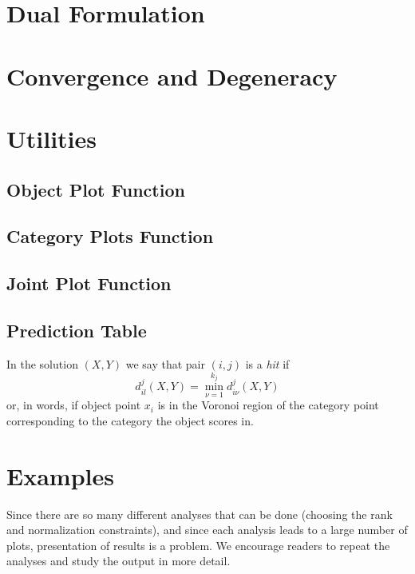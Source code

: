 \documentclass[
  12pt,
  letterpaper,
  DIV=11,
  numbers=noendperiod]{scrartcl}
\begin{document}
\section{Dual Formulation}\label{dual-formulation-1}

\section{Convergence and Degeneracy}\label{convergence-and-degeneracy}

\section{Utilities}\label{utilities}

\subsection{Object Plot Function}\label{object-plot-function}

\subsection{Category Plots Function}\label{category-plots-function}

\subsection{Joint Plot Function}\label{joint-plot-function}

\subsection{Prediction Table}\label{prediction-table}

In the solution \((X,Y)\) we say that pair \((i,j)\) is a \emph{hit} if
\[
d_{il}^j(X,Y)=\min_{\nu=1}^{k_j}d_{i\nu}^j(X,Y)
\] or, in words, if object point \(x_i\) is in the Voronoi region of the
category point corresponding to the category the object scores in.

\section{Examples}\label{examples}

Since there are so many different analyses that can be done (choosing
the rank and normalization constraints), and since each analysis leads
to a large number of plots, presentation of results is a problem. We
encourage readers to repeat the analyses and study the output in more
detail.
\end{document}
